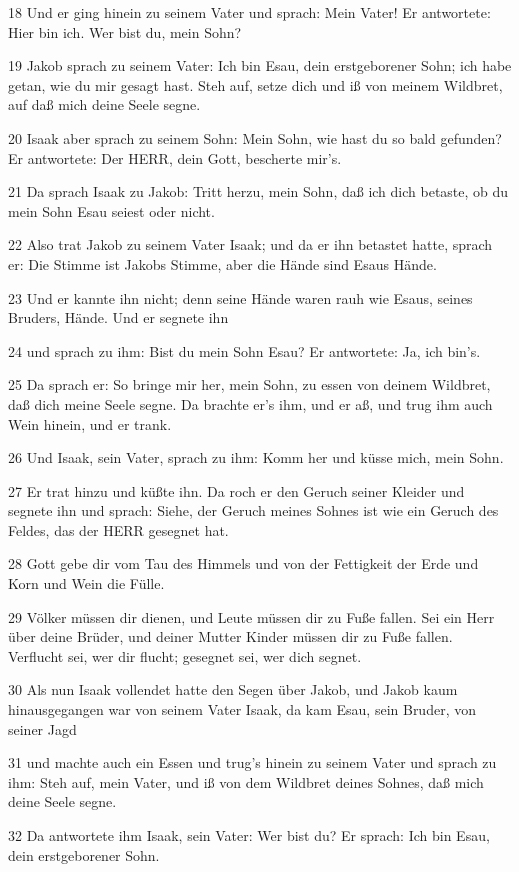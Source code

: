 \par 18 Und er ging hinein zu seinem Vater und sprach: Mein Vater! Er antwortete: Hier bin ich. Wer bist du, mein Sohn?
\par 19 Jakob sprach zu seinem Vater: Ich bin Esau, dein erstgeborener Sohn; ich habe getan, wie du mir gesagt hast. Steh auf, setze dich und iß von meinem Wildbret, auf daß mich deine Seele segne.
\par 20 Isaak aber sprach zu seinem Sohn: Mein Sohn, wie hast du so bald gefunden? Er antwortete: Der HERR, dein Gott, bescherte mir's.
\par 21 Da sprach Isaak zu Jakob: Tritt herzu, mein Sohn, daß ich dich betaste, ob du mein Sohn Esau seiest oder nicht.
\par 22 Also trat Jakob zu seinem Vater Isaak; und da er ihn betastet hatte, sprach er: Die Stimme ist Jakobs Stimme, aber die Hände sind Esaus Hände.
\par 23 Und er kannte ihn nicht; denn seine Hände waren rauh wie Esaus, seines Bruders, Hände. Und er segnete ihn
\par 24 und sprach zu ihm: Bist du mein Sohn Esau? Er antwortete: Ja, ich bin's.
\par 25 Da sprach er: So bringe mir her, mein Sohn, zu essen von deinem Wildbret, daß dich meine Seele segne. Da brachte er's ihm, und er aß, und trug ihm auch Wein hinein, und er trank.
\par 26 Und Isaak, sein Vater, sprach zu ihm: Komm her und küsse mich, mein Sohn.
\par 27 Er trat hinzu und küßte ihn. Da roch er den Geruch seiner Kleider und segnete ihn und sprach: Siehe, der Geruch meines Sohnes ist wie ein Geruch des Feldes, das der HERR gesegnet hat.
\par 28 Gott gebe dir vom Tau des Himmels und von der Fettigkeit der Erde und Korn und Wein die Fülle.
\par 29 Völker müssen dir dienen, und Leute müssen dir zu Fuße fallen. Sei ein Herr über deine Brüder, und deiner Mutter Kinder müssen dir zu Fuße fallen. Verflucht sei, wer dir flucht; gesegnet sei, wer dich segnet.
\par 30 Als nun Isaak vollendet hatte den Segen über Jakob, und Jakob kaum hinausgegangen war von seinem Vater Isaak, da kam Esau, sein Bruder, von seiner Jagd
\par 31 und machte auch ein Essen und trug's hinein zu seinem Vater und sprach zu ihm: Steh auf, mein Vater, und iß von dem Wildbret deines Sohnes, daß mich deine Seele segne.
\par 32 Da antwortete ihm Isaak, sein Vater: Wer bist du? Er sprach: Ich bin Esau, dein erstgeborener Sohn.
